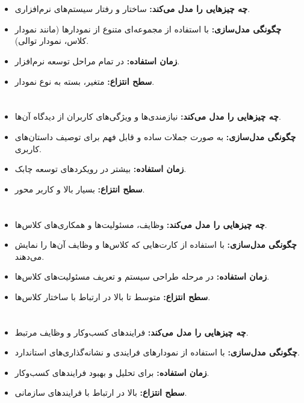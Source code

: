 \section*{}
\begin{itemize}
	\item \textbf{چه چیزهایی را مدل می‌کند:} ساختار و رفتار سیستم‌های نرم‌افزاری.
	\item \textbf{چگونگی مدل‌سازی:} با استفاده از مجموعه‌ای متنوع از نمودارها (مانند نمودار کلاس، نمودار توالی).
	\item \textbf{زمان استفاده:} در تمام مراحل توسعه نرم‌افزار.
	\item \textbf{سطح انتزاع:} متغیر، بسته به نوع نمودار.
\end{itemize}

\section*{}
\begin{itemize}
	\item \textbf{چه چیزهایی را مدل می‌کند:} نیازمندی‌ها و ویژگی‌های کاربران از دیدگاه آن‌ها.
	\item \textbf{چگونگی مدل‌سازی:} به صورت جملات ساده و قابل فهم برای توصیف داستان‌های کاربری.
	\item \textbf{زمان استفاده:} بیشتر در رویکردهای توسعه چابک.
	\item \textbf{سطح انتزاع:} بسیار بالا و کاربر محور.
\end{itemize}

\section*{}
\begin{itemize}
	\item \textbf{چه چیزهایی را مدل می‌کند:} وظایف، مسئولیت‌ها و همکاری‌های کلاس‌ها.
	\item \textbf{چگونگی مدل‌سازی:} با استفاده از کارت‌هایی که کلاس‌ها و وظایف آن‌ها را نمایش می‌دهند.
	\item \textbf{زمان استفاده:} در مرحله طراحی سیستم و تعریف مسئولیت‌های کلاس‌ها.
	\item \textbf{سطح انتزاع:} متوسط تا بالا در ارتباط با ساختار کلاس‌ها.
\end{itemize}

\section*{}
\begin{itemize}
	\item \textbf{چه چیزهایی را مدل می‌کند:} فرایندهای کسب‌وکار و وظایف مرتبط.
	\item \textbf{چگونگی مدل‌سازی:} با استفاده از نمودارهای فرایندی و نشانه‌گذاری‌های استاندارد.
	\item \textbf{زمان استفاده:} برای تحلیل و بهبود فرایندهای کسب‌وکار.
	\item \textbf{سطح انتزاع:} بالا در ارتباط با فرایندهای سازمانی.
\end{itemize}

